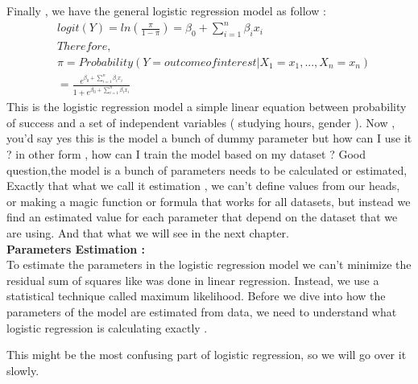 Finally , we have the general logistic regression model as follow :
\begin{align*}
    &logit(Y) = ln\left(\frac{\pi}{1-\pi}\right) = {\beta_0 + \sum_{i=1}^n \beta_i x_i }\\
    &Therefore,\\
    &\pi = Probability ( Y = outcome of interest | X_1 = x_1, ..., X_n = x_n )\\  
    &= { \frac{e^{\beta_0 + \sum_{i=1}^n \beta_i x_i }}{ {1+e^{\beta_0 + \sum_{i=1}^n \beta_i x_i }}} }
\end{align*}
This is the logistic regression model a simple linear equation  between probability of success and a set of independent variables ( studying hours, gender ).  Now , you'd say yes this is the model a bunch of dummy parameter but how can I use it ? in other form , how can I train the model based on my dataset ? Good question,the model is a bunch of parameters needs to be calculated or estimated, Exactly that what we call it estimation , we can't define values from our heads, or making a magic function or formula that works for all datasets, but instead we find an estimated value for each parameter that depend on the dataset that we are using. And that what we will see in the next chapter.\\
\textbf{Parameters Estimation : }\\
To estimate the parameters in the logistic regression model we can’t minimize the residual sum of squares like was done in linear regression. Instead, we use a statistical technique called maximum likelihood. 
Before we dive into how the parameters of the model are estimated from data, we need to understand what logistic regression is calculating exactly .

This might be the most confusing part of logistic regression, so we will go over it slowly.

